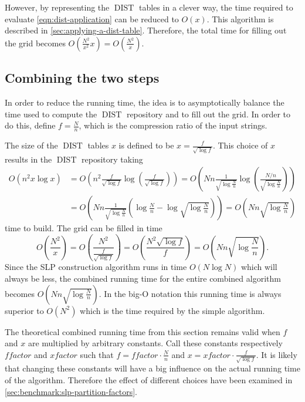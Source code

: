 \documentclass[twoside,11pt,openright]{report}
\newcommand{\DIST}{\operatorname{DIST}}
\begin{document}
However, by representing the $\DIST$ tables in a clever way, the time required to evaluate \cref{eqn:dist-application} can be reduced to $O(x)$. This algorithm is described in \cref{sec:applying-a-dist-table}. Therefore, the total time for filling out the grid becomes $O\left( \frac{N^2}{x^2}x \right) = O\left( \frac{N^2}{x} \right)$.

\subsection{Combining the two steps}
\label{sec:combining-the-two-steps}
In order to reduce the running time, the idea is to asymptotically balance the time used to compute the $\DIST$ repository and to fill out the grid. In order to do this, define $f = \frac{N}{n}$, which is the compression ratio of the input strings.

The size of the $\DIST$ tables $x$ is defined to be $x = \frac{f}{\sqrt{\log{f}}}$. This choice of $x$ results in the $\DIST$ repository taking
\begin{align*}
  O(n^2 x\log{x})
    &= O\left( n^2 \frac{f}{\sqrt{\log{f}}} \log\left( \frac{f}{\sqrt{\log{f}}} \right) \right)
    = O\left( Nn \frac{1}{\sqrt{\log{\frac{N}{n}}}} \log\left( \frac{N/n}{\sqrt{\log{\frac{N}{n}}}} \right) \right) \\
    &= O\left( Nn \frac{1}{\sqrt{\log{\frac{N}{n}}}} \left( \log{\frac{N}{n}} - \log{\sqrt{\log{\frac{N}{n}}}} \right) \right)
    = O\left( Nn\sqrt{\log{\frac{N}{n}}} \right)
\end{align*}
time to build. The grid can be filled in time
\[
  O\left(\frac{N^2}{x}\right)
    = O\left( \frac{N^2}{\frac{f}{\sqrt{\log{f}}}} \right)
    = O\left( \frac{N^2 \sqrt{\log{f}}}{f} \right)
    = O\left( Nn\sqrt{\log{\frac{N}{n}}} \right).
\]
Since the SLP construction algorithm runs in time $O(N\log{N})$ which will always be less, the combined running time for the entire combined algorithm becomes $O\left( Nn\sqrt{\log{\frac{N}{n}}} \right)$. In the big-O notation this running time is always superior to $O(N^2)$ which is the time required by the simple algorithm.

The theoretical combined running time from this section remains valid when $f$ and $x$ are multiplied by arbitrary constants. Call these constants respectively $ffactor$ and $xfactor$ such that $f = ffactor \cdot \frac{N}{n}$ and $x = xfactor \cdot \frac{f}{\sqrt{\log{f}}}$. It is likely that changing these constants will have a big influence on the actual running time of the algorithm. Therefore the effect of different choices have been examined in \cref{sec:benchmark:slp-partition-factors}.
\end{document}
